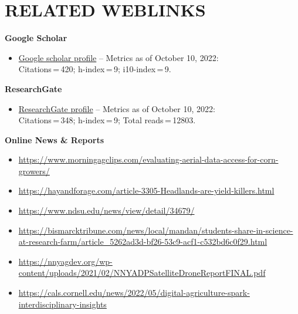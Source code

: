 \documentclass[11pt]{article}
\begin{document}
\section*{RELATED WEBLINKS}
\textbf{Google Scholar}\\
\begin{itemize}
\item \href{https://scholar.google.com/citations?user=PSu2s7YAAAAJ&hl=en}{Google scholar profile} -- Metrics as of October 10, 2022:\\
Citations\,=\,420; h-index\,=\,9; i10-index\,=\,9.
\end{itemize}

\textbf{ResearchGate}\\
\begin{itemize}
\item \href{https://www.researchgate.net/profile/Sunoj_Shajahan}{ResearchGate profile} -- Metrics as of October 10, 2022:\\
Citations\,=\,348; h-index\,=\,9; Total reads\,=\,12803.
\end{itemize}

\textbf{Online News \& Reports}\\
\begin{itemize}[itemsep=-0.5pt]
\item \url{https://www.morningagclips.com/evaluating-aerial-data-access-for-corn-growers/}\\
\item \url{https://hayandforage.com/article-3305-Headlands-are-yield-killers.html}\\
\item \url{https://www.ndsu.edu/news/view/detail/34679/}\\
\item \url{https://bismarcktribune.com/news/local/mandan/students-share-in-science-at-research-farm/article_5262ad3d-bf26-53c9-acf1-c532bd6c0f29.html} \\
\item \url{https://nnyagdev.org/wp-content/uploads/2021/02/NNYADPSatelliteDroneReportFINAL.pdf}\\
\item \href{https://cals.cornell.edu/news/2022/05/digital-agriculture-internships-spark-interdisciplinary-insights}{https://cals.cornell.edu/news/2022/05/digital-agriculture-spark-interdisciplinary-insights}
\end{itemize}
\end{document}
